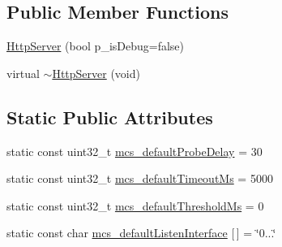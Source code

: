 \subsection*{Public Member Functions}
\begin{DoxyCompactItemize}
\item 
\hyperlink{classxtd_1_1servers_1_1app_1_1HttpServer_a3ebbe8af998a3e3738e41a72375ffea9}{Http\+Server} (bool p\+\_\+is\+Debug=false)
\item 
virtual \hyperlink{classxtd_1_1servers_1_1app_1_1HttpServer_a1082944f193865fc303c2d4a5569eaf9}{$\sim$\+Http\+Server} (void)
\end{DoxyCompactItemize}
\subsection*{Static Public Attributes}
\begin{DoxyCompactItemize}
\item 
static const uint32\+\_\+t \hyperlink{classxtd_1_1servers_1_1app_1_1HttpServer_a9ca36e61f5c201a51a68b3919e0badb7}{mcs\+\_\+default\+Probe\+Delay} = 30
\item 
static const uint32\+\_\+t \hyperlink{classxtd_1_1servers_1_1app_1_1HttpServer_abdc02697ffc7fa9f8f88252101b5d1b9}{mcs\+\_\+default\+Timeout\+Ms} = 5000
\item 
static const uint32\+\_\+t \hyperlink{classxtd_1_1servers_1_1app_1_1HttpServer_ad21741083478d35b92ba0b1da7499950}{mcs\+\_\+default\+Threshold\+Ms} = 0
\item 
static const char \hyperlink{classxtd_1_1servers_1_1app_1_1HttpServer_a38433b4c2d0bba9f0bae81266b42bac1}{mcs\+\_\+default\+Listen\+Interface} \mbox{[}$\,$\mbox{]} = \char`\"{}0...\char`\"{}
\end{DoxyCompactItemize}

